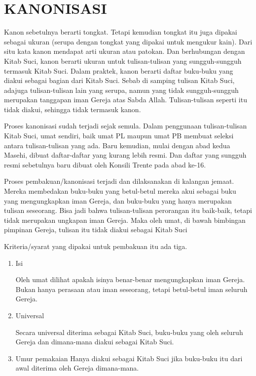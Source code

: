 \newpage
\section*{\center KANONISASI}
 
Kanon sebetulnya berarti tongkat.
Tetapi kemudian tongkat  itu  juga  dipakai  sebagai  ukuran
(serupa  dengan  tongkat  yang dipakai untuk mengukur kain).
Dari situ kata kanon mendapat arti ukuran atau patokan.  Dan
berhubungan  dengan  Kitab  Suci, kanon berarti ukuran untuk
tulisan-tulisan yang sungguh-sungguh  termasuk  Kitab  Suci.
Dalam  praktek,  kanon  berarti daftar buku-buku yang diakui
sebagai bagian dari Kitab Suci.  Sebab  di  samping  tulisan
Kitab  Suci, adajuga tulisan-tulisan lain yang serupa, namun
yang tidak sungguh-sungguh merupakan tanggapan  iman  Gereja
atas  Sabda Allah. Tulisan-tulisan seperti itu tidak diakui,
sehingga tidak termasuk kanon.

Proses kanonisasi  sudah  terjadi
sejak  semula.  Dalam penggunaan tulisan-tulisan Kitab Suci,
umat sendiri, baik umat PL maupun umat  PB  membuat  seleksi
antara tulisan-tulisan yang ada. Baru kemudian, mulai dengan
abad kedua Masehi, dibuat daftar-daftar  yang  kurang  lebih
resmi.  Dan daftar yang sungguh resmi sebetulnya baru dibuat
oleh Konsili Trente pada abad ke-16.

Proses   pembakuan/kanonisasi   terjadi   dan
dilaksanakan di kalangan jemaat. Mereka membedakan buku-buku
yang betul-betul mereka akui sebagai buku yang mengungkapkan
iman  Gereja,  dan  buku-buku  yang  hanya merupakan tulisan
seseorang. Bisa jadi bahwa  tulisan-tulisan  perorangan  itu
baik-baik, tetapi tidak merupakan ungkapan iman Gereja. Maka
oleh umat, di bawah bimbingan pimpinan Gereja,  tulisan  itu
tidak diakui sebagai Kitab Suci


Kriteria/syarat yang dipakai untuk pembakuan itu ada tiga.

\begin{enumerate} 
\item Isi

Oleh umat dilihat apakah isinya benar-benar
mengungkapkan iman Gereja. Bukan hanya  perasaan  atau  iman
seseorang, tetapi betul-betul iman seluruh Gereja.
 
\item Universal

Secara universal diterima sebagai Kitab Suci, buku-buku yang oleh seluruh  Gereja  dan
dimana-mana diakui sebagai Kitab Suci.

\item Umur pemakaian
Hanya  diakui  sebagai   Kitab   Suci jika
buku-buku itu dari awal diterima oleh Gereja dimana-mana.
\end{enumerate}
 
